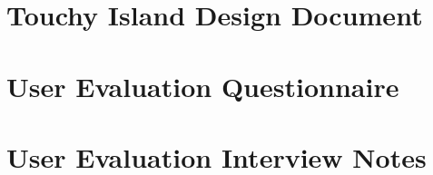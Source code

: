 \documentclass[12pt, a4paper]{report}
\begin{document}
\begin{appendices}



\begingroup%
\makeatletter%
\cleardoublepage%
\let\newpage\relax%
\let\clearpage\relax%
\vspace*{\fill}%
\vspace*{\dimexpr-50\p@-\baselineskip}%
\chapter{Touchy Island Design Document}
\label{apx:touchyIslandDesignDocument}
\vspace*{\fill}%
\endgroup%


\begingroup%
\makeatletter%
\cleardoublepage%
\let\newpage\relax%
\let\clearpage\relax%
\vspace*{\fill}%
\vspace*{\dimexpr-50\p@-\baselineskip}%
\chapter{User Evaluation Questionnaire}
\label{apx:questionnaire}
\vspace*{\fill}%
\endgroup%


\begingroup%
\makeatletter%
\cleardoublepage%
\let\newpage\relax%
\let\clearpage\relax%
\vspace*{\fill}%
\vspace*{\dimexpr-50\p@-\baselineskip}%
\chapter{User Evaluation Interview Notes}
\label{apx:interviewNotes}
\vspace*{\fill}%
\endgroup%


\end{appendices}
\end{document}
